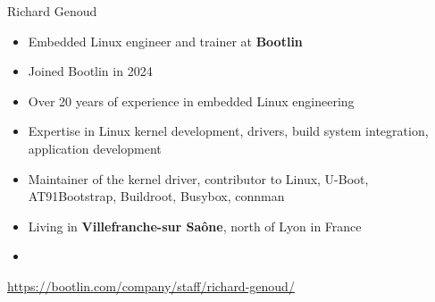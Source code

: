 \begin{frame}{Richard Genoud}
  \begin{itemize}
  \item Embedded Linux engineer and trainer at {\bf Bootlin}
  \item Joined Bootlin in 2024
  \item Over 20 years of experience in embedded Linux engineering
  \item Expertise in Linux kernel development, drivers, build system
    integration, application development
  \item Maintainer of the  kernel driver,
    contributor to Linux, U-Boot, AT91Bootstrap, Buildroot, Busybox,
    connman
  \item Living in {\bf Villefranche-sur Saône}, north of Lyon in France
  \item {}
  \end{itemize}
  {\small \url{https://bootlin.com/company/staff/richard-genoud/}}
\end{frame}

